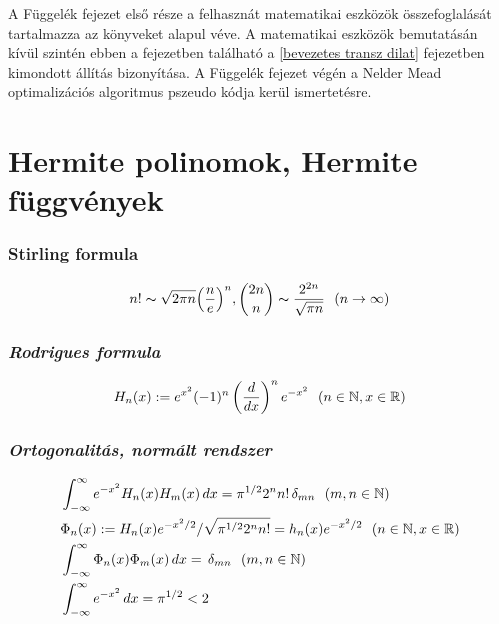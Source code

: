 \documentclass[oneside,titlepage,12pt,a4paper]{report}
\begin{document}
A Függelék fejezet első része a felhasznát matematikai eszközök összefoglalását tartalmazza az \cite{szego, szoke} könyveket alapul véve. A matematikai eszközök bemutatásán kívül szintén ebben a fejezetben található a \ref{bevezetes transz dilat} fejezetben kimondott állítás bizonyítása. A Függelék fejezet végén a Nelder Mead optimalizációs algoritmus pszeudo kódja kerül ismertetésre. 

\section {Hermite  polinomok, Hermite függvények}
\subsubsection{Stirling  formula}
\begin{equation*}
n!\thicksim \sqrt {2\pi n}\Big(\frac ne\Big)^n,  \binom {2n} n\thicksim \frac {2^{2n}}{\sqrt{\pi n}}\ \ (
n\to\infty)
\end{equation*}

\subsubsection{\it  Rodrigues formula}
\begin{equation}
\begin{split}
&H_n(x):=e^{x^2}(-1)^n\left(\frac d{dx}\right)^n e^{-x^2}\ \ (n\in\Bbb N, x\in\Bbb R)\\
\end{split}
\end{equation}

\subsubsection{\it  Ortogonalitás, normált rendszer}
\begin{equation}
\begin{split}
&\int_{-\infty}^\infty e^{-x^2}H_n(x)H_m(x)\, dx=\pi^{1/2}2^n n!\, \delta_{mn}\ \ (m,n\in\Bbb N)\\
&\Phi_n(x):=H_n(x)e^{-x^2/2}/\sqrt{\pi^{1/2}2^n n!}=h_n(x)e^{-x^2/2} \ \ (n\in\Bbb N, x\in\Bbb R)\\
&\int_{-\infty}^\infty \Phi_n(x)\Phi_m(x)\, dx=\, \delta_{mn}\ \ (m,n\in\Bbb N)\\
&\int_{-\infty}^\infty e^{-x^2}\, dx=\pi^{1/2}<2
\end{split}
\end{equation}
\end{document}
